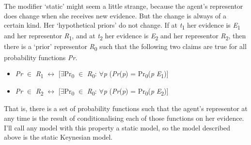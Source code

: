 \documentclass[
  11pt,
  letterpaper,
  DIV=11,
  numbers=noendperiod,
  oneside]{scrartcl}
\begin{document}
The modifier `static' might seem a little strange, because the agent's
representor does change when she receives new evidence. But the change
is always of a certain kind. Her `hypothetical priors' do not change. If
at \emph{t}\textsubscript{1} her evidence is \emph{E}\textsubscript{1}
and her representor \emph{R}\textsubscript{1}, and at
\emph{t}\textsubscript{2} her evidence is \emph{E}\textsubscript{2} and
her representor \emph{R}\textsubscript{2}, then there is a `prior'
representor \emph{R}\textsubscript{0} such that the following two claims
are true for all probability functions \emph{Pr}.

\begin{itemize}
\item
  \emph{Pr} \({\in}\) \emph{R}\textsubscript{1} \({\leftrightarrow}\)
  {[}\({\exists}\)Pr\textsubscript{0} \({\in}\)
  \emph{R}\textsubscript{0}: \({\forall}\)\emph{p} (\emph{Pr}(\emph{p})
  = Pr\textsubscript{0}(\emph{p} \emph{E}\textsubscript{1}){]}
\item
  \emph{Pr} \({\in}\) \emph{R}\textsubscript{2} \({\leftrightarrow}\)
  {[}\({\exists}\)Pr\textsubscript{0} \({\in}\)
  \emph{R}\textsubscript{0}: \({\forall}\)\emph{p} (\emph{Pr}(\emph{p})
  = Pr\textsubscript{0}(\emph{p} \emph{E}\textsubscript{2}){]}
\end{itemize}

That is, there is a set of probability functions such that the agent's
representor at any time is the result of conditionalising each of those
functions on her evidence. I'll call any model with this property a
static model, so the model described above is the static Keynesian
model.
\end{document}
